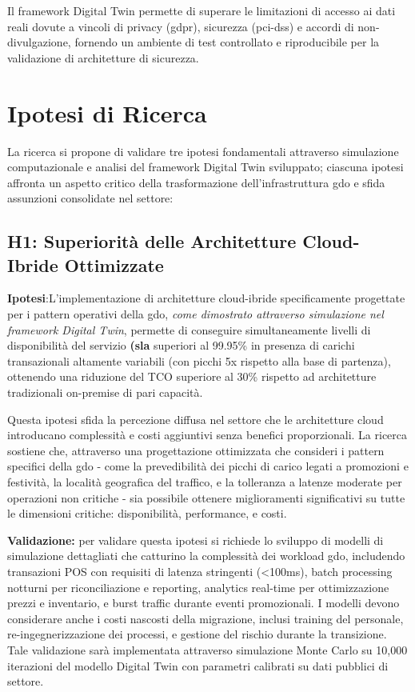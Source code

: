 Il framework Digital Twin permette di superare le limitazioni di accesso ai dati reali dovute a vincoli di privacy (\gls{gdpr}), sicurezza (\gls{pci-dss}) e accordi di non-divulgazione, fornendo un ambiente di test controllato e riproducibile per la validazione di architetture di sicurezza.

\section{\texorpdfstring{\textbf{Ipotesi di Ricerca}}{1.4 - Ipotesi di Ricerca}}
\label{sec:ipotesi_ricerca}

La ricerca si propone di validare tre ipotesi fondamentali attraverso 
simulazione computazionale e analisi del framework Digital Twin sviluppato; ciascuna ipotesi affronta un aspetto critico della trasformazione dell'infrastruttura \gls{gdo} e sfida assunzioni consolidate nel settore:

\subsection{\texorpdfstring{\textbf{H1: Superiorità delle Architetture Cloud-Ibride Ottimizzate}}{1.4.1 - H1: Superiorità delle Architetture Cloud-Ibride Ottimizzate}}

\label{ssec:h1}
\textbf{Ipotesi}:L'implementazione di architetture cloud-ibride specificamente progettate per i pattern operativi della \gls{gdo}, \textit{come dimostrato attraverso 
simulazione nel framework Digital Twin}, permette di conseguire simultaneamente livelli di disponibilità del servizio \textbf{(\gls{sla}} superiori al 99.95\% in presenza di carichi transazionali altamente variabili (con picchi 5x rispetto alla base di partenza), ottenendo una riduzione del TCO superiore al 30\% rispetto ad architetture tradizionali on-premise di pari capacità.

Questa ipotesi sfida la percezione diffusa nel settore che le architetture cloud introducano complessità e costi aggiuntivi senza benefici proporzionali. La ricerca sostiene che, attraverso una progettazione ottimizzata che consideri i pattern specifici della \gls{gdo} - come la prevedibilità dei picchi di carico legati a promozioni e festività, la località geografica del traffico, e la tolleranza a latenze moderate per operazioni non critiche - sia possibile ottenere miglioramenti significativi su tutte le dimensioni critiche: disponibilità, performance, e costi.

\textbf{Validazione:} per validare questa ipotesi si richiede lo sviluppo di modelli di simulazione dettagliati che catturino la complessità dei workload \gls{gdo}, includendo transazioni POS con requisiti di latenza stringenti (<100ms), batch processing notturni per riconciliazione e reporting, analytics real-time per ottimizzazione prezzi e inventario, e burst traffic durante eventi promozionali. I modelli devono considerare anche i costi nascosti della migrazione, inclusi training del personale, re-ingegnerizzazione dei processi, e gestione del rischio durante la transizione. Tale validazione sarà implementata attraverso simulazione Monte Carlo su 10,000 iterazioni del modello Digital Twin con parametri calibrati su dati pubblici di settore.

